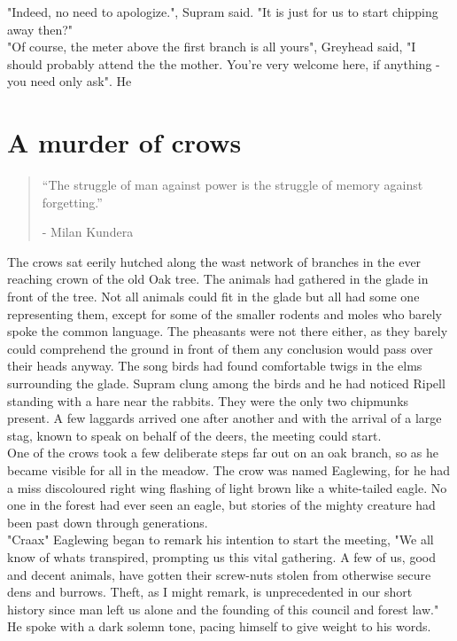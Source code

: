 \documentclass[smalldemyvopaper,11pt,twoside,onecolumn,openright,extrafontsizes]{memoir}
\begin{document}
"Indeed, no need to apologize.", Supram said. "It is just for us to start chipping away then?"\\

"Of course, the meter above the first branch is all yours", Greyhead said, "I should probably attend the the mother. You're very welcome here, if anything - you need only ask". He 


\chapter{A murder of crows}

\vspace{-1.3cm}
\begin{localsize}{10}
	\begin{quote}
		“The struggle of man against power is the struggle of memory against forgetting.”
		\begin{flushright}- Milan Kundera \end{flushright}
	\end{quote} 
\end{localsize}
\vspace{1cm}

The crows sat eerily hutched along the wast network of branches in the ever reaching crown of the old Oak tree. The animals had gathered in the glade in front of the tree. Not all animals could fit in the glade but all had some one representing them, except for some of the smaller rodents and moles who barely spoke the common language. The pheasants were not there either, as they barely could comprehend the ground in front of them any conclusion would pass over their heads anyway. The song birds had found comfortable twigs in the elms surrounding the glade. Supram clung among the birds and he had noticed Ripell standing with a hare near the rabbits. They were the only two chipmunks present. A few laggards arrived one after another and with the arrival of a large stag, known to speak on behalf of the deers, the meeting could start. \\

One of the crows took a few deliberate steps far out on an oak branch, so as he became visible for all in the meadow. The crow was named Eaglewing, for he had a miss discoloured right wing flashing of light brown like a white-tailed eagle. No one in the forest had ever seen an eagle, but stories of the mighty creature had been past down through generations.\\

"Craax" Eaglewing began to remark his intention to start the meeting, "We all know of whats transpired, prompting us this vital gathering. A few of us, good and decent animals, have gotten their screw-nuts stolen from otherwise secure dens and burrows. Theft, as I might remark, is unprecedented in our short history since man left us alone and the founding of this council and forest law." He spoke with a dark solemn tone, pacing himself to give weight to his words.
\end{document}
